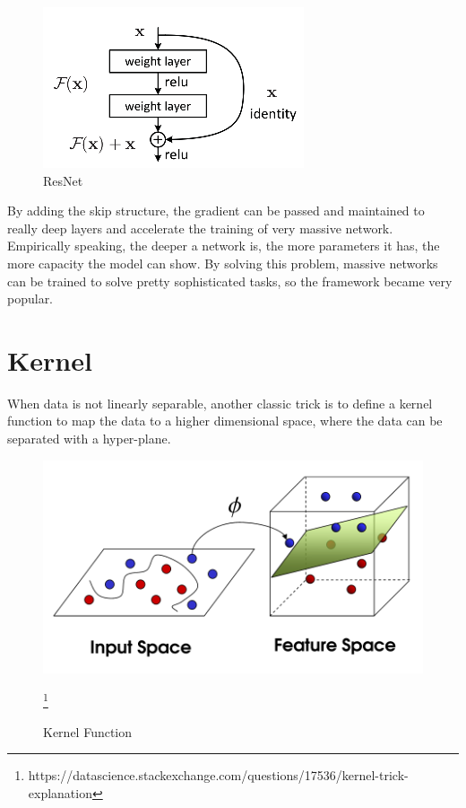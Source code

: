 \documentclass[10pt,twocolumn,letterpaper]{article}
\begin{document}
	\begin{figure}[h]
		\begin{center}
			\includegraphics[width=\linewidth]{images/resnet}
			\caption{ResNet\cite{he_zhang_ren_sun_2016}}
		\end{center}
	\end{figure}
	
	By adding the skip structure, the gradient can be passed and maintained to really deep layers and accelerate the training of very massive network. Empirically speaking, the deeper a network is, the more parameters it has, the more capacity the model can show. By solving this problem, massive networks can be trained to solve pretty sophisticated tasks, so the framework became very popular. 
\section{Kernel}
	When data is not linearly separable, another classic trick is to define a kernel function to map the data to a higher dimensional space, where the data can be separated with a hyper-plane.
	
	\begin{figure}[h]
		\begin{center}
			\includegraphics[width=\linewidth]{images/kernel}
			\caption{Kernel Function}\footnote{https://datascience.stackexchange.com/questions/17536/kernel-trick-explanation}
		\end{center}
	\end{figure}
	
\end{document}
